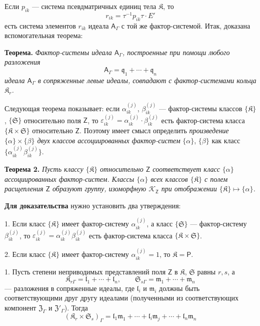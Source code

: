 \documentclass[11pt]{article}
\begin{document}
Если \(p_{ik}\) --- система псевдматричных единиц тела \(\mathfrak K\), то
\[
r_{ik}=\tau^{-1}p_{ik}\tau\cdot E'
\]
есть система элементов \(r_{ik}\) идеала \(\mathsf{A}_\Gamma\) с той же фактор-системой. Итак, доказана вспомогательная теорема:

\textbf{Теорема.} \emph{Фактор-системы идеала \(\mathsf{A}_\Gamma\), построенные при помощи любого разложения}
\[
\mathsf{A}_\Gamma=\mathfrak q_1+\cdots+\mathfrak q_n
\]
\emph{идеала \(\mathsf{A}_\Gamma\) в сопряженные левые идеалы, совпадают с фактор-системами кольца \(\mathfrak K_r\).}

Следующая теорема показывает: если \(\alpha_{ik}^{(j)}\), \(\beta_{ik}^{(j)}\) --- фактор-системы классов \(\{\mathfrak K\}\), \(\{\mathfrak S\}\) относительно поля \(\mathsf{Z}\), то \(\varepsilon_{ik}^{(j)}=\alpha_{ik}^{(j)}\cdot\beta_{ik}^{(j)}\) есть фактор-система класса \(\{\mathfrak K\times\mathfrak S\}\) относительно \(\mathsf{Z}\). Поэтому имеет смысл определить \emph{произведение \(\{\alpha\}\times\{\beta\}\) двух классов ассоциированных фактор-систем} \(\{\alpha\}\), \(\{\beta\}\) как класс \(\{\alpha_{ik}^{(j)}\beta_{ik}^{(j)}\}\).

\textbf{Теорема 2.} \emph{Пусть классу \(\{\mathfrak K\}\) относительно \(\mathsf{Z}\) соответствует класс \(\{\alpha\}\) ассоциированных фактор-систем. Классы \(\{\alpha\}\) всех классов \(\{\mathfrak K\}\) с полем расщепления \(\mathsf{Z}\) образуют группу, изоморфную \(\mathscr K_{\mathsf{Z}}\) при отображении \(\{\mathfrak K\}\mapsto\{\alpha\}\).}

\textbf{Для доказательства} нужно установить два утверждения:

1. Если класс \(\{\mathfrak K\}\) имеет фактор-систему \(\alpha_{ik}^{(j)}\), а класс \(\{\mathfrak S\}\) --- фактор-систему \(\beta_{ik}^{(j)}\), то \(\varepsilon_{ik}^{(j)}=\alpha_{ik}^{(j)}\beta_{ik}^{(j)}\) есть фактор-система класса \(\{\mathfrak K\times\mathfrak S\}\).

2. Если класс \(\{\mathfrak K\}\) имеет фактор-систему \(\alpha_{ik}^{(j)}=1\), то \(\mathfrak K=\mathsf P\).

1. Пусть степени неприводимых представлений поля \(\mathsf{Z}\) в \(\mathfrak K\), \(\mathfrak S\) равны \(r,s\), а
\[
\mathfrak K_{r\Gamma}=\mathfrak l_1+\cdots+\mathfrak l_n,\qquad
\mathfrak S_{s\Gamma}=\mathfrak m_1+\cdots+\mathfrak m_n
\]
--- разложения в сопряженные идеалы, где \(\mathfrak l_i\) и \(\mathfrak m_i\) должны быть соответствующими друг другу идеалами (полученными из соответствующих компонент \(\mathfrak Z_\Gamma\) и \(\mathfrak Z'_\Gamma\)). Тогда
\[
(\mathfrak K_r\times\mathfrak S_s)_\Gamma
=\mathfrak l_1\mathfrak m_1+\cdots+\mathfrak l_i\mathfrak m_j+\cdots+\mathfrak l_n\mathfrak m_n
\]
\end{document}
